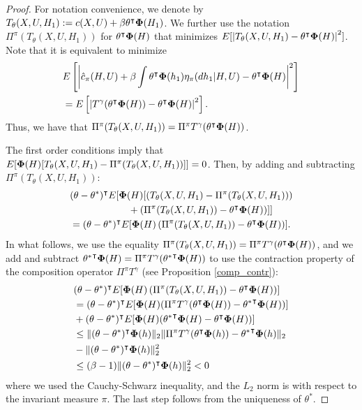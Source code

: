 \documentclass[letterpaper, 10 pt, conference]{ieeeconf}  %
\theoremstyle{definition}
\theoremstyle{remark}
\begin{document}
\begin{proof}
For notation convenience, we denote by $T_\theta(X,U,H_1):= c(X,U)+\beta \theta^\intercal{\bf \Phi}(H_1)$. We further use the notation $\Pi^\pi(T_\theta(X,U,H_1))$ for $\theta^\intercal {\bf \Phi}(H)$ that minimizes $E[\left|T_\theta(X,U,H_1) - \theta^\intercal{\bf \Phi}(H)\right|^2]$. Note that it is equivalent to minimize 
\begin{align*}
&E\left[\left| \hat{c}_\pi(H,U) + \beta \int \theta^\intercal {\bf \Phi}(h_1)  \eta_\pi(dh_1|H,U)- \theta^\intercal{\bf \Phi}(H)\right|^2\right]\\
&=E\left[\left| T^\gamma ( \theta^\intercal{\bf \Phi}(H)  )- \theta^\intercal{\bf \Phi}(H)\right|^2\right].
\end{align*}
Thus, we have that $\Pi^\pi(T_\theta(X,U,H_1))=\Pi^\pi T^\gamma(\theta^\intercal{\bf \Phi}(H)  )$. 

The first order conditions imply that $E[{\bf \Phi}(H)[ T_\theta(X,U,H_1) - \Pi^\pi(T_\theta(X,U,H_1)) ] ]=0$. Then,  by adding and subtracting $\Pi^\pi(T_\theta(X,U,H_1))$:
\begin{align*}
&(\theta-\theta^*)^\intercal E[ {\bf \Phi}(H)[ \left(T_\theta(X,U,H_1) - \Pi^\pi(T_\theta(X,U,H_1))\right)\\
&\qquad\qquad\qquad +\left(   \Pi^\pi(T_\theta(X,U,H_1))-\theta^\intercal{\bf \Phi}(H)\right)] ]\\
& = (\theta-\theta^*)^\intercal E[ {\bf \Phi}(H)\left(   \Pi^\pi(T_\theta(X,U,H_1))-\theta^\intercal{\bf \Phi}(H)\right)] .
\end{align*}
In what follows, we use the equality $\Pi^\pi(T_\theta(X,U,H_1))=\Pi^\pi T^\gamma(\theta^\intercal{\bf \Phi}(H)  )$, and we add and subtract ${\theta^*}^\intercal{\bf \Phi}(H) =\Pi^\pi T^\gamma({\theta^*}^\intercal{\bf \Phi}(H)  )$ to use the contraction property of the composition operator $\Pi^\pi T^\gamma$ (see Proposition \ref{comp_contr}):
\begin{align*}
&(\theta-\theta^*)^\intercal E[ {\bf \Phi}(H)\left(   \Pi^\pi(T_\theta(X,U,H_1))-\theta^\intercal{\bf \Phi}(H)\right)] \\
&= (\theta-\theta^*)^\intercal E[ {\bf \Phi}(H) (\Pi^\pi T^\gamma(\theta^\intercal{\bf \Phi}(H))-  {\theta^*}^\intercal{\bf \Phi}(H)  ) ]\\
& +  (\theta-\theta^*)^\intercal E[ {\bf \Phi}(H) ( {\theta^*}^\intercal{\bf \Phi}(H) -  \theta^\intercal{\bf \Phi}(H)  )]\\
&\leq  \| (\theta-\theta^*)^\intercal  {\bf \Phi}(h)\|_2 \| \Pi^\pi T^\gamma(\theta^\intercal{\bf \Phi}(h))-  {\theta^*}^\intercal{\bf \Phi}(h)\|_2\\
& - \| (\theta-\theta^*)^\intercal  {\bf \Phi}(h)\|^2_2\\
& \leq  (\beta-1) \| (\theta-\theta^*)^\intercal  {\bf \Phi}(h)\|^2_2 <0
\end{align*}
where we used the Cauchy-Schwarz inequality, and the $L_2$ norm is with respect to the invariant measure $\pi$. The last step follows from the uniqueness of $\theta^*$.
\end{proof}
\end{document}
